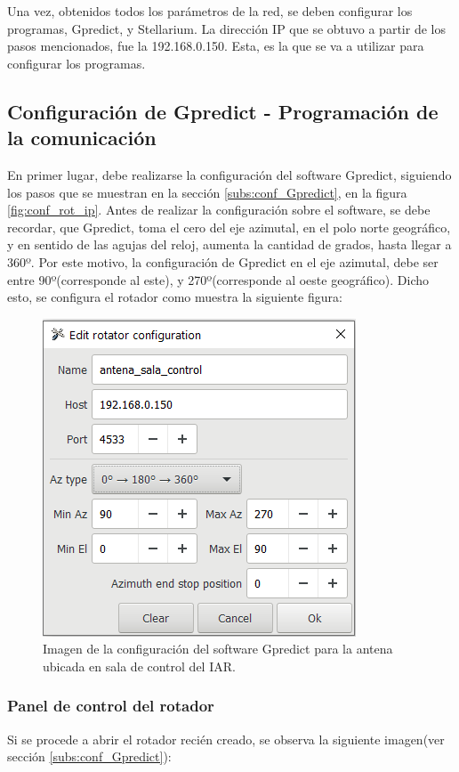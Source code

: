 Una vez, obtenidos todos los parámetros de la red, se deben configurar los programas, Gpredict, y Stellarium. La dirección IP que se obtuvo a partir de los pasos mencionados, fue la 192.168.0.150. Esta, es la que se va a utilizar para configurar los programas. 

\subsection{Configuración de Gpredict - Programación de la comunicación} 

En primer lugar, debe realizarse la configuración del software Gpredict, siguiendo los pasos que se muestran en la sección \ref{subs:conf_Gpredict}, en la figura \ref{fig:conf_rot_ip}. Antes de realizar la configuración sobre el software, se debe recordar, que Gpredict, toma el cero del eje azimutal, en el polo norte geográfico, y en sentido de las agujas del reloj, aumenta la cantidad de grados, hasta llegar a 360º. Por este motivo, la configuración de Gpredict en el eje azimutal, debe ser entre 90º(corresponde al este), y 270º(corresponde al
oeste geográfico). Dicho esto, se configura el rotador como muestra la siguiente figura: 
 
\begin{figure}[ht]
	\centering 
	\includegraphics{conf_rotador_gpr}
	\caption{Imagen de la configuración del software Gpredict para la antena ubicada en sala de control del IAR. }
	\label{fig:conf_rot_sala_control}
\end{figure}
%
\subsubsection{Panel de control del rotador}
Si se procede a abrir el rotador recién creado, se observa la siguiente imagen(ver sección \ref{subs:conf_Gpredict}): 

